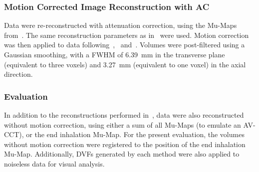             \subsubsection{Motion Corrected Image Reconstruction with AC} \label{sec:comparison_of_motion_correction_methods_incorporating_motion_modelling_for_pet_ct_using_a_single_breath_hold_attenuation_map_attenuation_corrected_image_reconstruction}
                Data were re-reconstructed with attenuation correction, using the \glspl{Mu-Map} from~. The same reconstruction parameters as in~ were used. Motion correction was then applied to data following~,~ and~. Volumes were post-filtered using a Gaussian smoothing, with a \gls{FWHM} of \SI{6.39}{\milli\metre} in the transverse plane (equivalent to three voxels) and \SI{3.27}{\milli\metre} (equivalent to one voxel) in the axial direction.
            
            \subsubsection{Evaluation} \label{sec:comparison_of_motion_correction_methods_incorporating_motion_modelling_for_pet_ct_using_a_single_breath_hold_attenuation_map_evaluation}
                In addition to the reconstructions performed in~, data were also reconstructed without motion correction, using either a sum of all \glspl{Mu-Map} (to emulate an \gls{AV-CCT}), or the end inhalation \gls{Mu-Map}. For the present evaluation, the volumes without motion correction were registered to the position of the end inhalation \gls{Mu-Map}. Additionally, \glspl{DVF} generated by each method were also applied to noiseless data for visual analysis.
                
